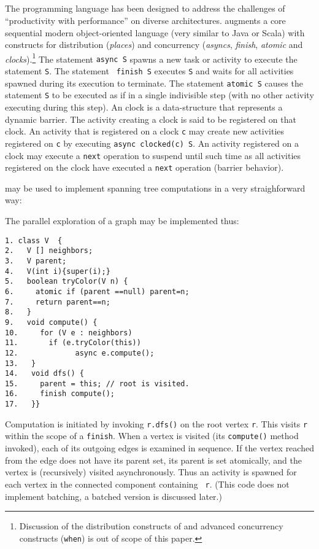 \subsection{\Xten{}}
The \Xten{} programming language \cite{x10} has been designed to
address the challenges of ``productivity with performance'' on 
diverse architectures.  \Xten{} augments a core
sequential modern object-oriented language (very similar to Java or Scala) with constructs for distribution ({\em places}) and
concurrency ({\em asyncs}, {\em finish}, {\em atomic} and {\em
clocks}).\footnote{Discussion of the distribution constructs of
\Xten{} and advanced concurrency constructs ({\tt when}) is out of
scope of this paper.}  The statement {\tt async S} spawns a new task
or activity to execute the statement {\tt S}. The statement {\tt
finish S} executes {\tt S} and waits for all activities spawned during
its execution to terminate. The statement {\tt atomic S} causes the
statement {\tt S} to be executed as if in a single indivisible step
(with no other activity executing during this step). An \Xten{} clock
is a data-structure that represents a dynamic barrier. The activity
creating a clock is said to be registered on that clock. An activity
that is registered on a clock {\tt c} may create new activities
registered on {\tt c} by executing {\tt async clocked(c) S}. An
activity registered on a clock may execute a {\tt next} operation to
suspend until such time as all activities registered on the clock have
executed a {\tt next} operation (barrier behavior).

\Xten{} may be used to implement spanning tree computations in a very straighforward way:
\begin{example} \label{example:dfs}
The parallel exploration of a graph may be implemented thus:
{\footnotesize
\begin{verbatim}
1. class V  {
2.   V [] neighbors;
3.   V parent;
4.   V(int i){super(i);}
5.   boolean tryColor(V n) {
6.     atomic if (parent ==null) parent=n;
7.     return parent==n;
8.   }
9.   void compute() {
10.     for (V e : neighbors) 
11.       if (e.tryColor(this)) 
12.             async e.compute();
13.   }
14.   void dfs() {
15.     parent = this; // root is visited.
16.     finish compute();
17.   }}
\end{verbatim}}
Computation is initiated by invoking {\tt r.dfs()} on the root vertex
{\tt r}. This visits {\tt r} within the scope of a {\tt finish}. When
a vertex is visited (its {\tt compute()} method invoked), each of its
outgoing edges is examined in sequence. If the vertex reached from the
edge does not have its parent set, its parent is set atomically, and
the vertex is (recursively) visited asynchronously. Thus an activity
is spawned for each vertex in the connected component containing {\tt
r}. (This code does not implement batching, a batched version is
discussed later.)
\end{example}

